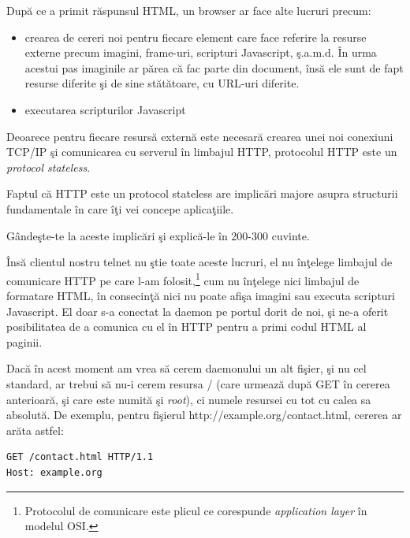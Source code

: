 După ce a primit răspunsul HTML, un browser ar face alte lucruri precum:
\begin{itemize}
\item crearea de cereri noi pentru fiecare element care face referire la resurse
externe precum imagini, frame-uri, scripturi Javascript, ş.a.m.d. În urma 
acestui pas imaginile ar părea că fac parte din document, însă ele sunt de fapt
resurse diferite şi de sine stătătoare, cu URL-uri diferite.
\item executarea scripturilor Javascript
\end{itemize}

Deoarece pentru fiecare resursă externă este necesară crearea unei noi conexiuni
TCP/IP şi comunicarea cu serverul în limbajul HTTP, protocolul HTTP este
un \textsl{protocol stateless}.


\begin{Exercise}[title={HTTP e stateless}]
Faptul că HTTP este un protocol stateless are implicări majore asupra
structurii fundamentale în care îţi vei concepe aplicaţiile.

Gândeşte-te la aceste implicări şi explică-le în 200-300 cuvinte.
\end{Exercise}

Însă clientul nostru telnet nu ştie toate aceste lucruri, el nu înţelege
limbajul de comunicare HTTP pe care l-am folosit,\footnote{Protocolul
de comunicare este {\glqq}plicul{\grqq} ce corespunde \textsl{application layer} în modelul OSI.}
cum nu înţelege nici limbajul
de formatare HTML, în consecinţă nici nu poate afişa imagini sau executa scripturi Javascript.
El doar s-a conectat la daemon pe portul dorit de noi, şi ne-a oferit posibilitatea
de a comunica cu el în HTTP pentru a primi codul HTML al paginii.

Dacă în acest moment am vrea să cerem daemonului un alt fişier, şi nu cel standard,
ar trebui să nu-i cerem resursa {\glqq}/{\grqq} (care urmează după {\glqq}GET{\grqq} în cererea anterioară,
şi care este numită şi \textsl{root}),
ci numele resursei cu tot cu calea sa absolută. De exemplu, pentru fişierul
{\glqq}http://example.org/contact.html{\grqq},
cererea ar arăta astfel:

\begin{verbatim}
GET /contact.html HTTP/1.1
Host: example.org

\end{verbatim}

